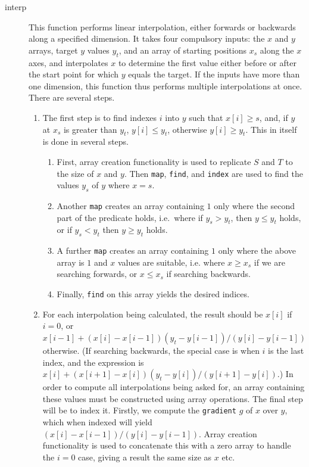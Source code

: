 \documentclass[preprint,authoryear,12pt]{elsarticle}
\newcommand{\code}[1]{\texttt{#1}}
\begin{document}
\begin{description}
\item[interp]
  This function performs linear interpolation, either forwards or backwards along a specified dimension.
  It takes four compulsory inputs: the $x$ and $y$ arrays, target $y$ values $y_t$, and an array of starting positions $x_s$ along the $x$ axes, and interpolates $x$ to determine the first value either before or after the start point for which $y$ equals the target.
  If the inputs have more than one dimension, this function thus performs multiple interpolations at once.
  There are several steps.
  \begin{enumerate}
  \item
    The first step is to find indexes $i$ into $y$ such that $x[i] \geq s$, and, if $y$ at $x_s$ is greater than $y_t$, $y[i] \leq y_t$, otherwise $y[i] \geq y_t$.
    This in itself is done in several steps.
    \begin{enumerate}
    \item
      First, array creation functionality is used to replicate $S$ and $T$ to the size of $x$ and $y$.
      Then \code{map}, \code{find}, and \code{index} are used to find the values $y_s$ of $y$ where $x = s$.
    \item
      Another \code{map} creates an array containing $1$ only where the second part of the predicate holds, i.e.\ where if $y_s > y_t$, then $y \leq y_t$ holds, or if $y_s < y_t$ then $y \geq y_t$ holds.
    \item
      A further \code{map} creates an array containing $1$ only where the above array is $1$ and $x$ values are suitable, i.e. where $x \geq x_s$ if we are searching forwards, or $x \leq x_s$ if searching backwards.
    \item
      Finally, \code{find} on this array yields the desired indices.
    \end{enumerate}
  \item
    For each interpolation being calculated, the result should be $x[i]$ if $i=0$, or $x[i-1] + (x[i]-x[i-1])(y_t-y[i-1])/(y[i]-y[i-1])$ otherwise.
    (If searching backwards, the special case is when $i$ is the last index, and the expression is $x[i] + (x[i+1]-x[i])(y_t-y[i])/(y[i+1]-y[i])$.)
    In order to compute all interpolations being asked for, an array containing these values must be constructed using array operations.
    The final step will be to index it.
    Firstly, we compute the \code{gradient} $g$ of $x$ over $y$, which when indexed will yield $(x[i]-x[i-1])/(y[i]-y[i-1])$.
    Array creation functionality is used to concatenate this with a zero array to handle the $i=0$ case, giving a result the same size as $x$ etc.

\end{enumerate}
\end{description}
\end{document}
